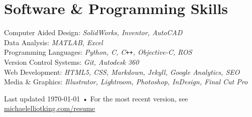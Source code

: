 \documentclass[11pt, letterpaper]{article}
\newcommand{\years}[1]{\marginnote{\footnotesize #1}} %
\begin{document}


  \section*{Software \& Programming Skills}
  Computer Aided Design: \emph{SolidWorks, Inventor, AutoCAD}\\
  Data Analysis: \emph{MATLAB, Excel}\\
  Programming Languages: \emph{Python, C, C}\verb!++!\emph{, Objective-C, ROS}\\
  Version Control Systems: \emph{Git, Autodesk 360}\\
  Web Development: \emph{HTML5, CSS, Markdown, Jekyll, Google Analytics, SEO}\\
  Media \& Graphics: \emph{Illustrator, Lightroom, Photoshop, InDesign, Final Cut Pro}



\begin{center}
{\hspace{-.5in} \scriptsize Last updated \today\- •\- For the most recent version, see \href{http://www.michaelelliotking.com/resume}{michaelelliotking.com/resume}}
\end{center}
\end{document}
